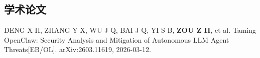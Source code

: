 
\begin{resume}
  \section*{学术论文}

  \begin{achievements}
    \item DENG X H, ZHANG Y X, WU J Q, BAI J Q, YI S B, \textbf{ZOU Z H},
      et al. Taming OpenClaw: Security Analysis and Mitigation of Autonomous
      LLM Agent Threats[EB/OL]. arXiv:2603.11619, 2026-03-12.
  \end{achievements}
\end{resume}

